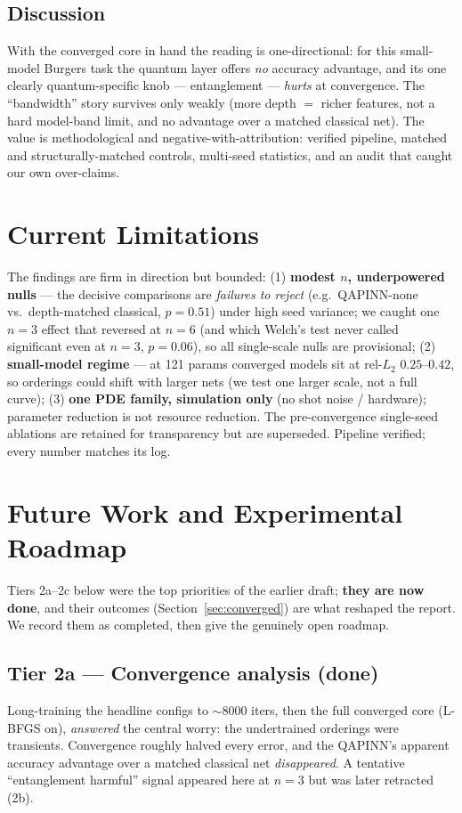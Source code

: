 \documentclass[11pt]{article}
\begin{document}
\subsection{Discussion}
With the converged core in hand the reading is one-directional: for this small-model
Burgers task the quantum layer offers \emph{no} accuracy advantage, and its one
clearly quantum-specific knob --- entanglement --- \emph{hurts} at convergence. The
``bandwidth'' story survives only weakly (more depth $=$ richer features, not a hard
model-band limit, and no advantage over a matched classical net). The value is
methodological and negative-with-attribution: verified pipeline, matched and
structurally-matched controls, multi-seed statistics, and an audit that caught our
own over-claims.

\section{Current Limitations}
The findings are firm in direction but bounded: (1) \textbf{modest $n$, underpowered
nulls} --- the decisive comparisons are \emph{failures to reject} (e.g.\ QAPINN-none
vs.\ depth-matched classical, $p=0.51$) under high seed variance; we caught one $n=3$
effect that reversed at $n=6$ (and which Welch's test never called significant even at
$n=3$, $p=0.06$), so all single-scale nulls are provisional; (2) \textbf{small-model
regime} --- at 121 params converged models sit at rel-$L_2$ $0.25$--$0.42$, so
orderings could shift with larger nets (we test one larger scale, not a full curve);
(3) \textbf{one PDE family, simulation only} (no shot noise / hardware); parameter
reduction is not resource reduction. The pre-convergence single-seed ablations are
retained for transparency but are superseded. Pipeline verified; every number matches
its log.

\section{Future Work and Experimental Roadmap}
\label{sec:roadmap}
Tiers 2a--2c below were the top priorities of the earlier draft; \textbf{they are now
done}, and their outcomes (Section~\ref{sec:converged}) are what reshaped the report.
We record them as completed, then give the genuinely open roadmap.

\subsection{Tier 2a --- Convergence analysis \textnormal{(\textbf{done})}}
Long-training the headline configs to $\sim$8000 iters, then the full converged core
(L-BFGS on), \emph{answered} the central worry: the undertrained orderings were
transients. Convergence roughly halved every error, and the QAPINN's apparent
accuracy advantage over a matched classical net \emph{disappeared}. A tentative
``entanglement harmful'' signal appeared here at $n=3$ but was later retracted (2b).
\end{document}
